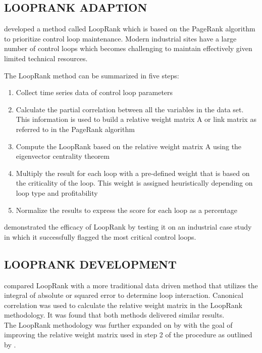 \subsection{LOOPRANK ADAPTION}

\cite{farenzena2009looprank} developed a method called LoopRank which is based on the PageRank algorithm to prioritize control loop maintenance. Modern industrial sites have a large number of control loops which becomes challenging to maintain effectively given limited technical resources. 

The LoopRank method can be summarized in five steps:
\begin{enumerate}
	\item Collect time series data of control loop parameters
	\item Calculate the partial correlation between all the variables in the data set. This information is used to build a relative weight matrix A or link matrix as referred to in the PageRank algorithm
	\item Compute the LoopRank based on the relative weight matrix A using the eigenvector centrality theorem
	\item Multiply the result for each loop with a pre-defined weight that is based on the criticality of the loop. This weight is assigned heuristically depending on loop type and profitability
	\item Normalize the results to express the score for each loop as a percentage
\end{enumerate}

\cite{farenzena2009looprank} demonstrated the efficacy of LoopRank by testing it on an industrial case study in which it successfully flagged the most critical control loops.

\subsection{LOOPRANK DEVELOPMENT}

\cite{rahman2010new} compared LoopRank with a more traditional data driven method that utilizes the integral of absolute or squared error to determine loop interaction. Canonical correlation was used to calculate the relative weight matrix in the LoopRank methodology. It was found that both methods delivered similar results.\\ 

The LoopRank methodology was further expanded on by \cite{streicher2014eigenvector} with the goal of improving the relative weight matrix used in step 2 of the procedure as outlined by \cite{farenzena2009looprank}.\\

